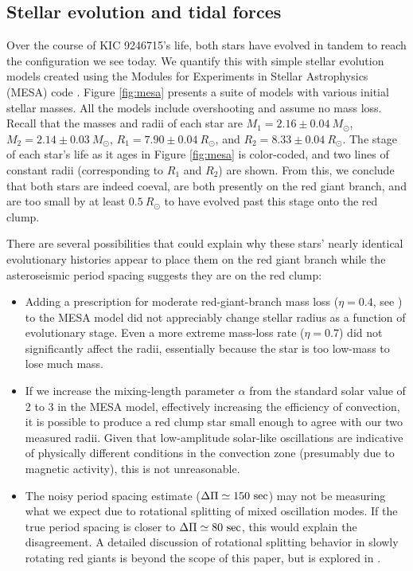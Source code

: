 \subsection{Stellar evolution and tidal forces}\label{tides}

Over the course of KIC 9246715's life, both stars have evolved in tandem to reach the configuration we see today. We quantify this with simple stellar evolution models created using the Modules for Experiments in Stellar Astrophysics (MESA) code \citep{pax11,pax13,pax15}. Figure \ref{fig:mesa} presents a suite of models with various initial stellar masses. All the models include overshooting and assume no mass loss. Recall that the masses and radii of each star are $M_1 = 2.16 \pm 0.04\ M_{\odot}$, $M_2 = 2.14 \pm 0.03\ M_{\odot}$, $R_1 = 7.90 \pm 0.04 \ R_{\odot}$, and $R_2 = 8.33 \pm 0.04 \ R_{\odot}$. The stage of each star's life as it ages in Figure \ref{fig:mesa} is color-coded, and two lines of constant radii (corresponding to $R_1$ and $R_2$) are shown. From this, we conclude that both stars are indeed coeval, are both presently on the red giant branch, and are too small by at least $0.5 \ R_\odot$ to have evolved past this stage onto the red clump.

There are several possibilities that could explain why these stars' nearly identical evolutionary histories appear to place them on the red giant branch while the asteroseismic period spacing suggests they are on the red clump:
\begin{itemize}
\item Adding a prescription for moderate red-giant-branch mass loss ($\eta = 0.4$, see \citet{mig12}) to the MESA model did not appreciably change stellar radius as a function of evolutionary stage. Even a more extreme mass-loss rate ($\eta = 0.7$) did not significantly affect the radii, essentially because the star is too low-mass to lose much mass.
\item If we increase the mixing-length parameter $\alpha$ from the standard solar value of 2 to 3 in the MESA model, effectively increasing the efficiency of convection, it is possible to produce a red clump star small enough to agree with our two measured radii. Given that low-amplitude solar-like oscillations are indicative of physically different conditions in the convection zone (presumably due to magnetic activity), this is not unreasonable.
\item The noisy period spacing estimate ($\Delta \Pi \simeq 150 \ \rm{sec}$) may not be measuring what we expect due to rotational splitting of mixed oscillation modes. If the true period spacing is closer to $\Delta \Pi \simeq 80 \ \rm{sec}$, this would explain the disagreement. A detailed discussion of rotational splitting behavior in slowly rotating red giants is beyond the scope of this paper, but is explored in \citet{gou13}.
\end{itemize}

  
  
  
  